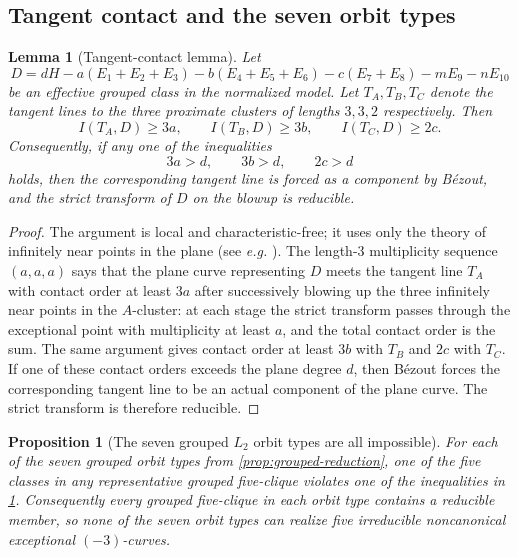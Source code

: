 \documentclass[11pt]{article}
\newtheorem{proposition}[proposition]{Proposition}
\newtheorem{lemma}[lemma]{Lemma}
\theoremstyle{definition}
\newcommand{\eg}{\emph{e.g.}}
\begin{document}
\subsection{Tangent contact and the seven orbit types}

\begin{lemma}[Tangent-contact lemma]\label{lem:tangent-contact}
Let
\[
D=dH-a(E_1+E_2+E_3)-b(E_4+E_5+E_6)-c(E_7+E_8)-mE_9-nE_{10}
\]
be an effective grouped class in the normalized model. Let $T_A,T_B,T_C$ denote the tangent lines to the three proximate clusters of lengths $3,3,2$ respectively. Then
\[
I(T_A,D)\ge 3a,
\qquad
I(T_B,D)\ge 3b,
\qquad
I(T_C,D)\ge 2c.
\]
Consequently, if any one of the inequalities
\[
3a>d,
\qquad
3b>d,
\qquad
2c>d
\]
holds, then the corresponding tangent line is forced as a component by B\'ezout, and the strict transform of $D$ on the blowup is reducible.
\end{lemma}

\begin{proof}
The argument is local and characteristic-free; it uses only the theory of infinitely near points in the plane (see \eg{} \cite[\S3.3]{CasasAlvero00}). The length-$3$ multiplicity sequence $(a,a,a)$ says that the plane curve representing $D$ meets the tangent line $T_A$ with contact order at least $3a$ after successively blowing up the three infinitely near points in the $A$-cluster: at each stage the strict transform passes through the exceptional point with multiplicity at least $a$, and the total contact order is the sum. The same argument gives contact order at least $3b$ with $T_B$ and $2c$ with $T_C$. If one of these contact orders exceeds the plane degree $d$, then B\'ezout forces the corresponding tangent line to be an actual component of the plane curve. The strict transform is therefore reducible.\qedhere
\end{proof}

\begin{proposition}[The seven grouped $L_2$ orbit types are all impossible]\label{prop:seven-orbits}
For each of the seven grouped orbit types from \cref{prop:grouped-reduction}, one of the five classes in any representative grouped five-clique violates one of the inequalities in \cref{lem:tangent-contact}. Consequently every grouped five-clique in each orbit type contains a reducible member, so none of the seven orbit types can realize five irreducible noncanonical exceptional $(-3)$-curves.
\end{proposition}
\end{document}
